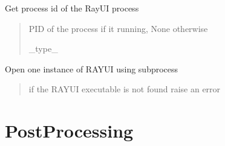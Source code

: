 \documentclass[letterpaper,10pt,english]{sphinxmanual}
\begin{document}
\begin{fulllineitems}

\begin{fulllineitems}
\label{\detokenize{index:raypyng.runner.RayUIRunner.pid}}
\pysigstartsignatures
{}
\pysigstopsignatures
\sphinxAtStartPar
Get process id of the RayUI process
\begin{quote}\begin{description}
\sphinxAtStartPar
PID of the process if it running, None otherwise

\sphinxAtStartPar
\_type\_

\end{description}\end{quote}

\end{fulllineitems}


\begin{fulllineitems}
\label{\detokenize{index:raypyng.runner.RayUIRunner.run}}
\pysigstartsignatures
{}
\pysigstopsignatures
\sphinxAtStartPar
Open one instance of RAY\sphinxhyphen{}UI using subprocess
\begin{quote}\begin{description}
\sphinxAtStartPar
{} \textendash{} if the RAY\sphinxhyphen{}UI executable is not found raise an error

\end{description}\end{quote}

\end{fulllineitems}


\end{fulllineitems}



\chapter{PostProcessing}
\label{\detokenize{index:postprocessing}}
\end{document}

